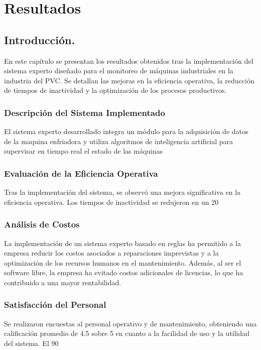 \fancyhead{}
\fancyfoot{}
\cfoot{\thepage}


\chapter{Resultados}



\section{Introducción.}
En este capítulo se presentan los resultados obtenidos tras la implementación del sistema experto diseñado para el monitoreo de máquinas industriales en la industria del PVC. Se detallan las mejoras en la eficiencia operativa, la reducción de tiempos de inactividad y la optimización de los procesos productivos.
\subsection{Descripción del Sistema Implementado}
El sistema experto desarrollado integra un módulo para la adquisición de datos de la maquina enfriadora y utiliza algoritmos de inteligencia artificial para supervisar en tiempo real el estado de las máquinas
\subsection{Evaluación de la Eficiencia Operativa}
Tras la implementación del sistema, se observó una mejora significativa en la eficiencia operativa. Los tiempos de inactividad se redujeron en un 20%
\subsection{Análisis de Costos}
La implementación de un sistema experto basado en reglas ha permitido a la empresa reducir los costos asociados a reparaciones imprevistas y a la optimización de los recursos humanos en el mantenimiento. Además, al ser el software libre, la empresa ha evitado costos adicionales de licencias, lo que ha contribuido a una mayor rentabilidad.
\subsection{Satisfacción del Personal}
Se realizaron encuestas al personal operativo y de mantenimiento, obteniendo una calificación promedio de 4.5 sobre 5 en cuanto a la facilidad de uso y la utilidad del sistema. El 90%

